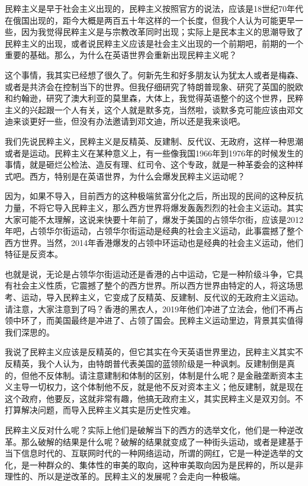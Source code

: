 \documentclass[UTF8, 12pt, a4paper]{ctexrep}
\begin{document}
民粹主义是早于社会主义出现的，民粹主义按照官方的说法，应该是18世纪70年代在俄国出现的，距今大概是两百五十年这样的一个长度，但我个人认为可能更早一些，因为我觉得民粹主义是与宗教改革同时出现；实际上是民本主义的思潮导致了民粹主义的出现，或者说民粹主义应该是社会主义出现的一个前期吧，前期的一个重要的基础。那么，为什么在英语世界会重新出现民粹主义呢？

这个事情，我其实已经想了很久了。何新先生和好多朋友认为犹太人或者是梅森、或者是共济会在控制当下的世界。但我仔细研究了特朗普现象、研究了英国的脱欧和约翰逊，研究了澳大利亚的莫里森，大体上，我觉得英语整个的这个世界，民粹主义的兴起跟一个人有关，这个人就是默多克，当然啦，谈默多克可能应该由邓文迪来谈更好一些，但没有办法邀请到邓文迪，所以还是我来谈吧。

我们先说民粹主义，民粹主义是反精英、反建制、反代议、无政府，这样一种思潮或者是运动。民粹主义在某种意义上，有一些像我国1966年到1976年的时候发生的事情，就是砸烂公检法、造反有理、红司令、这个专政，就是一种革委会的这种样式吧。西方，特别是在英语世界，为什么会爆发民粹主义运动呢？

因为，如果不导入，目前西方的这种极端贫富分化之后，所出现的民间的这种反抗力量，不将它导入民粹主义，那么西方世界将爆发轰轰烈烈的社会主义运动。其实大家可能不太理解，这说来快要十年前了，爆发于美国的占领华尔街，应该是2012年吧，占领华尔街运动，占领华尔街运动是经典的社会主义运动，此事震撼了整个西方世界。当然，2014年香港爆发的占领中环运动也是经典的社会主义运动，他们特征是反资本。

也就是说，无论是占领华尔街运动还是香港的占中运动，它是一种阶级斗争，它具有社会主义性质，它震撼了整个的西方世界。所以西方世界由特定的人，将这场思考、运动，导入民粹主义，它变成了反精英、反建制、反代议的无政府主义运动。请注意，大家注意到了吗？香港的黑衣人，2019年他们冲进了立法会，他们不再占领中环了，而美国最终是冲进了、占领了国会。民粹主义运动里边，背景其实值得我们深思的。

我说了民粹主义应该是反精英的，但它其实在今天英语世界里边，民粹主义其实不反精英，我个人认为，由特朗普代表美国的蓝领阶级是一种讽刺。反建制倒是真的，但他不反体制。请注意建制和体制的区别，体制是什么呢？是金融垄断资本主义主导一切权力，这个体制他不反，就是他不反对资本主义；他反建制，就是现在这个政府，他要反，这就非常有趣，他搞无政府主义，其实民粹主义是双刃剑。不打算解决问题，而导入民粹主义其实是历史性灾难。

民粹主义反对什么呢？实际上他们是破解当下的西方的选举文化，他们是一种逆改革。那么破解的结果是什么呢？破解的结果就变成了一种街头运动，或者是建基于当下信息时代的、互联网时代的一种网络运动，所谓的网红，它是一种逆选举的文化，是一种群众的、集体性的审美的取向，这种审美取向因为是民粹的，所以是非理性的、所以是逆改革的。民粹主义的发展呢？会走向一种极端。
\end{document}
